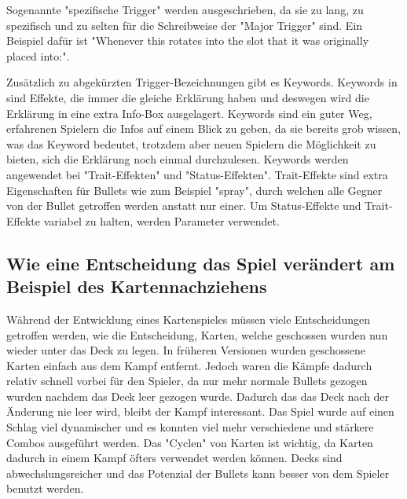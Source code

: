 Sogenannte "spezifische Trigger" werden ausgeschrieben, da sie zu lang, zu spezifisch und zu selten für die Schreibweise der "Major Trigger" sind. Ein Beispiel dafür ist
"Whenever this rotates into the slot that it was originally placed into:".


Zusätzlich zu abgekürzten Trigger-Bezeichnungen gibt es Keywords. Keywords in \FF sind Effekte, die immer die gleiche
Erklärung haben und deswegen wird die Erklärung in eine extra Info-Box ausgelagert.
Keywords sind ein guter Weg, erfahrenen Spielern die Infos auf einem Blick zu geben, da sie bereits grob wissen, was das
Keyword bedeutet, trotzdem aber neuen Spielern die Möglichkeit zu bieten, sich die Erklärung noch einmal durchzulesen.
Keywords werden angewendet bei "Trait-Effekten" und "Status-Effekten". Trait-Effekte sind extra Eigenschaften für Bullets
wie zum Beispiel "spray", durch welchen alle Gegner von der Bullet getroffen werden anstatt nur einer.
Um Status-Effekte und Trait-Effekte variabel zu halten, werden Parameter verwendet. %








%


\subsection{Wie eine Entscheidung das Spiel verändert am Beispiel des Kartennachziehens}\label{subsec:placementMatters}

Während der Entwicklung eines Kartenspieles müssen viele Entscheidungen getroffen werden, wie \zB die Entscheidung,
Karten, welche geschossen wurden nun wieder unter das Deck zu legen. In früheren \FF Versionen wurden geschossene Karten einfach aus dem Kampf entfernt.
Jedoch waren die Kämpfe dadurch relativ schnell vorbei für den Spieler, da nur mehr normale Bullets gezogen wurden nachdem das Deck leer gezogen wurde.
Dadurch das das Deck nach der Änderung nie leer wird, bleibt der Kampf interessant.
Das Spiel wurde auf einen Schlag viel dynamischer und es konnten viel mehr verschiedene und stärkere Combos ausgeführt werden. Das "Cyclen"
von Karten ist wichtig, da Karten dadurch in einem Kampf öfters verwendet werden können. Decks sind abwechslungsreicher und das Potenzial der Bullets
kann besser von dem Spieler benutzt werden.


